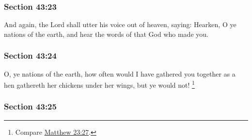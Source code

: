 
	\subsubsection{Section 43:23} %
		\label{DC43-23}

		And again, the Lord shall utter his voice out of heaven, saying: Hearken, O ye nations of the earth, and hear the words of that God who made you.


	\subsubsection{Section 43:24} %
		\label{DC43-24}

		O, ye nations of the earth, how often would I have gathered you together as a hen gathereth her chickens under her wings, but ye would not!%
			\footnote{%
				Compare \hyperref[MATTHEW-23-37]{Matthew 23:27}.
				}


	\subsubsection{Section 43:25} %
		\label{DC43-25}

